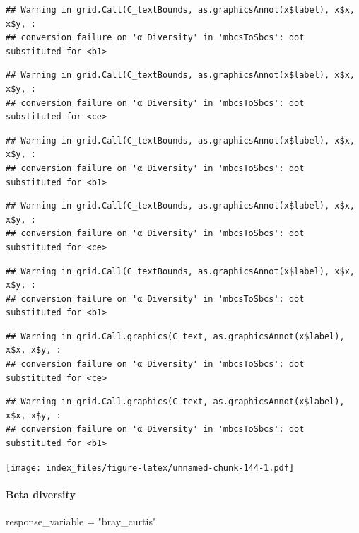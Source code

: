 \documentclass[
]{article}
\newenvironment{Shaded}{\begin{snugshade}}{\end{snugshade}}
\newcommand{\NormalTok}[1]{#1}
\newcommand{\OtherTok}[1]{\textcolor[rgb]{0.56,0.35,0.01}{#1}}
\newcommand{\StringTok}[1]{\textcolor[rgb]{0.31,0.60,0.02}{#1}}
\begin{document}
\begin{verbatim}
## Warning in grid.Call(C_textBounds, as.graphicsAnnot(x$label), x$x, x$y, :
## conversion failure on 'α Diversity' in 'mbcsToSbcs': dot substituted for <b1>
\end{verbatim}

\begin{verbatim}
## Warning in grid.Call(C_textBounds, as.graphicsAnnot(x$label), x$x, x$y, :
## conversion failure on 'α Diversity' in 'mbcsToSbcs': dot substituted for <ce>
\end{verbatim}

\begin{verbatim}
## Warning in grid.Call(C_textBounds, as.graphicsAnnot(x$label), x$x, x$y, :
## conversion failure on 'α Diversity' in 'mbcsToSbcs': dot substituted for <b1>
\end{verbatim}

\begin{verbatim}
## Warning in grid.Call(C_textBounds, as.graphicsAnnot(x$label), x$x, x$y, :
## conversion failure on 'α Diversity' in 'mbcsToSbcs': dot substituted for <ce>
\end{verbatim}

\begin{verbatim}
## Warning in grid.Call(C_textBounds, as.graphicsAnnot(x$label), x$x, x$y, :
## conversion failure on 'α Diversity' in 'mbcsToSbcs': dot substituted for <b1>
\end{verbatim}

\begin{verbatim}
## Warning in grid.Call.graphics(C_text, as.graphicsAnnot(x$label), x$x, x$y, :
## conversion failure on 'α Diversity' in 'mbcsToSbcs': dot substituted for <ce>
\end{verbatim}

\begin{verbatim}
## Warning in grid.Call.graphics(C_text, as.graphicsAnnot(x$label), x$x, x$y, :
## conversion failure on 'α Diversity' in 'mbcsToSbcs': dot substituted for <b1>
\end{verbatim}

\texttt{[image: index\_files/figure-latex/unnamed-chunk-144-1.pdf]}

\hypertarget{beta-diversity}{%
\paragraph{Beta diversity}\label{beta-diversity}}

\begin{Shaded}
\begin{Highlighting}[]
\NormalTok{response\_variable }\OtherTok{=} \StringTok{"bray\_curtis"}
\end{Highlighting}
\end{Shaded}
\end{document}
